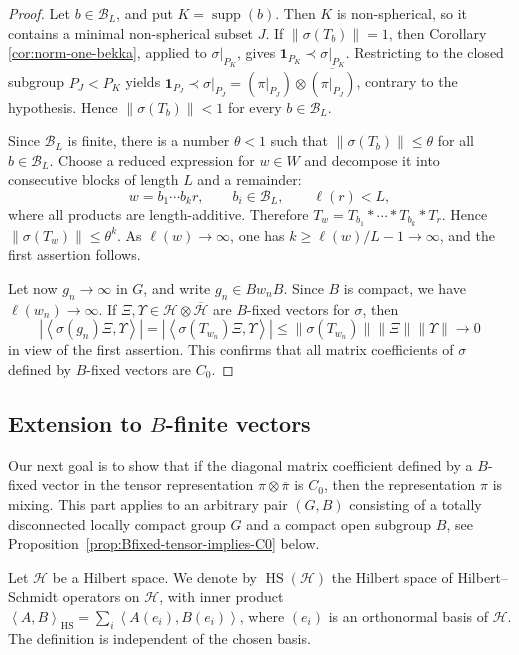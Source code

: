 \documentclass[12pt,a4paper]{amsproc}
\theoremstyle{definition}
\DeclareMathOperator{\supp}{supp}
\DeclareMathOperator{\HS}{HS}
\newcommand{\cH}{\mathcal H}
\newcommand{\one}{\mathbf 1}
\newcommand{\ol}[1]{\overline{#1}}
\newcommand{\norm}[1]{\left\lVert #1\right\rVert}
\newcommand{\ip}[2]{\left\langle #1,#2\right\rangle}
\newcommand{\weakcontain}{\prec}
\begin{document}
\begin{proof}
Let $b\in\mathcal B_L$, and put $K=\supp(b)$. Then $K$ is non-spherical, so it contains a minimal non-spherical subset $J$. If $\norm{\sigma(T_b)}=1$, then Corollary \ref{cor:norm-one-bekka}, applied to $\sigma|_{P_K}$, gives $\one_{P_K}\weakcontain \sigma|_{P_K}$. Restricting to the closed subgroup $P_J<P_K$ yields $\one_{P_J}\weakcontain \sigma|_{P_J} = (\pi|_{P_J})\otimes\ol{(\pi|_{P_J})}$, contrary to the hypothesis. Hence $\norm{\sigma(T_b)}<1$ for every $b\in\mathcal B_L$.

Since $\mathcal B_L$ is finite, there is a number $\theta<1$ such that $\norm{\sigma(T_b)}\leq\theta$ for all $b\in\mathcal B_L$.
Choose a reduced expression for $w\in W$ and decompose it into consecutive blocks of length $L$ and a remainder:
\[
        w=b_1\cdots b_k r,
        \qquad b_i\in\mathcal B_L,
        \qquad \ell(r)<L,
\]
where all products are length-additive. Therefore $T_w=T_{b_1}*\cdots*T_{b_k}*T_r$. Hence $\norm{\sigma(T_w)}\leq \theta^k$. As $\ell(w)\to\infty$, one has $k \geq \ell(w)/L -1 \to\infty$, and the first assertion follows.

Let now $g_n\to\infty$ in $G$, and write $g_n\in Bw_nB$. Since $B$ is compact, we have $\ell(w_n)\to\infty$. 
If $\Xi,\Upsilon \in \cH \otimes \overline{\cH}$ are $B$-fixed vectors for $\sigma$, then
\[
        |\ip{\sigma(g_n)\Xi}{\Upsilon}|
        =|\ip{\sigma(T_{w_n})\Xi}{\Upsilon}| \leq \| \sigma(T_{w_n})\| \| \Xi \| \| \Upsilon \| 
        \to 0 
\]
in view of the first assertion. This confirms that all matrix coefficients of $\sigma$ defined by $B$-fixed vectors are $C_0$.  
\end{proof}



\subsection{Extension to $B$-finite vectors}
\label{sec:B-finite}

Our next goal is to show that if the diagonal matrix coefficient defined by a $B$-fixed vector in the tensor representation $\pi \otimes \ol \pi$ is $C_0$, then the representation $\pi$ is mixing. This part applies to an arbitrary pair $(G, B)$ consisting of a totally disconnected locally compact group $G$ and a compact open subgroup $B$, see Proposition~\ref{prop:Bfixed-tensor-implies-C0} below.

\medskip

Let $\cH$ be a Hilbert space. We denote by $\HS(\cH)$ the Hilbert space of Hilbert--Schmidt operators on $\cH$, with inner product $\ip{A}{B}_{\HS}=\sum_i \ip{A(e_i)}{B(e_i)}$, where $(e_i)$ is an orthonormal basis of $\cH$. The definition is independent of the chosen basis.
\end{document}
